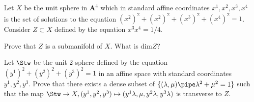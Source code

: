 Let $X$ be the unit sphere in $\mathbf{A}^4$ which in standard affine
coordinates $x^1,x^2,x^3,x^4$ is the set of solutions to the equation
$(x^2)^2+(x^2)^2+(x^3)^2+(x^4)^2=1$. Consider $Z\subset X$ defined by
the equation $x^3x^4=1/4$.  
\begin{alist}
\item Prove that $Z$ is a submanifold of $X$. What is $\mathrm{dim}Z$?
\item Let $\Stw$ be the unit $2$-sphere defined by the equation 
$(y^1)^2+(y^2)^2+(y^3)^2=1$ in an affine space with standard
coordinates $y^1,y^2,y^3$. Prove that there exists a dense subset of
$\{(\lambda,\mu) \pipe \lambda^2+\mu^2=1\}$ such that the map
$\Stw\rightarrow X, (y^1,y^2,y^3)\mapsto
(y^1\lambda,\mu,y^2\lambda,y^3\lambda)$ is transverse to $Z$.
\end{alist}
